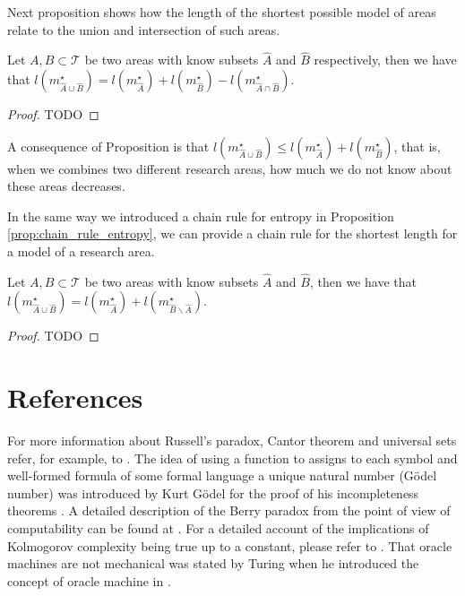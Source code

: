Next proposition \label{prop:areas_union} shows how the length of the shortest possible model of areas relate to the union and intersection of such areas.

\begin{proposition}
\label{prop:areas_union}
Let $A, B \subset \mathcal{T}$ be two areas with know subsets $\hat{A}$ and $\hat{B}$ respectively, then we have that $l \left( m_{\hat{A} \cup \hat{B}}^{\star} \right) = l \left( m_{\hat{A}}^{\star} \right) + l \left( m_{\hat{B}}^{\star} \right) - l \left( m_{\hat{A} \cap \hat{B}}^{\star} \right)$.
\end{proposition}
\begin{proof}
{\color{red} TODO}
\end{proof}

A consequence of Proposition \label{prop:areas_union} is that $l \left( m_{\hat{A} \cup \hat{B}}^{\star} \right) \leq l \left( m_{\hat{A}}^{\star} \right) + l \left( m_{\hat{B}}^{\star} \right)$, that is, when we combines two different research areas, how much we do not know about these areas decreases.

In the same way we introduced a chain rule for entropy in Proposition \ref{prop:chain_rule_entropy}, we can provide a chain rule for the shortest length for a model of a research area.

\begin{proposition}
Let $A, B \subset \mathcal{T}$ be two areas with know subsets $\hat{A}$ and $\hat{B}$, then we have that $l \left( m_{\hat{A} \cup \hat{B}}^{\star} \right) = l \left( m_{\hat{A}}^{\star} \right) + l \left( m_{\hat{B} \backslash \hat{A}}^{\star} \right)$.
\end{proposition}
\begin{proof}
{\color{red} TODO}
\end{proof}

%
%

\section*{References}

For more information about Russell's paradox, Cantor theorem and universal sets refer, for example, to \cite{jech2013set}. The idea of using a function to assigns to each symbol and well-formed formula of some formal language a unique natural number (Gödel number) was introduced by Kurt Gödel for the proof of his incompleteness theorems \cite{godel1931formal}. A detailed description of the Berry paradox from the point of view of computability can be found at \cite{chaitin1995berry}. For a detailed account of the implications of Kolmogorov complexity being true up to a constant, please refer to \cite{li2013introduction}. That oracle machines are not mechanical was stated by Turing when he introduced the concept of oracle machine in \cite{turing1939systems}.




